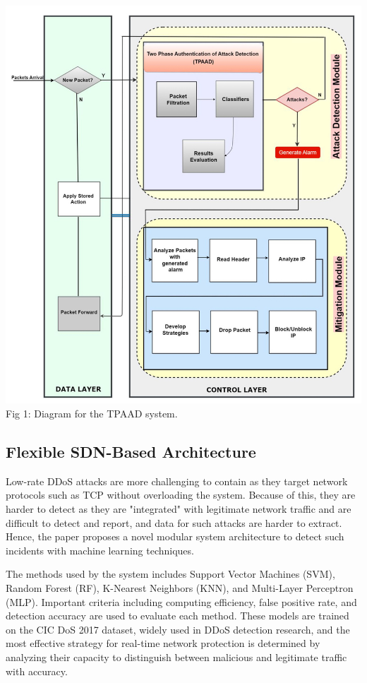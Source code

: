 \documentclass[a4paper, 12pt]{article}
\begin{document}
\includegraphics[scale=0.3]{IMG_0249.jpeg} \\
Fig 1: Diagram for the TPAAD system. 

\subsection{Flexible SDN-Based Architecture}
Low-rate DDoS attacks are more challenging to contain as they target network protocols such as TCP without overloading the system. Because of this, they are harder to detect as they are "integrated" with legitimate network traffic and are difficult to detect and report, and data for such attacks are harder to extract. Hence, the paper proposes a novel modular system architecture to detect such incidents with machine learning techniques. 

The methods used by the system includes Support Vector Machines (SVM), Random Forest (RF), K-Nearest Neighbors (KNN), and Multi-Layer Perceptron (MLP).  Important criteria including computing efficiency, false positive rate, and detection accuracy are used to evaluate each method. These models are trained on the CIC DoS 2017 dataset, widely used in DDoS detection research, and the most effective strategy for real-time network protection is determined by analyzing their capacity to distinguish between malicious and legitimate traffic with accuracy. 
\end{document}

